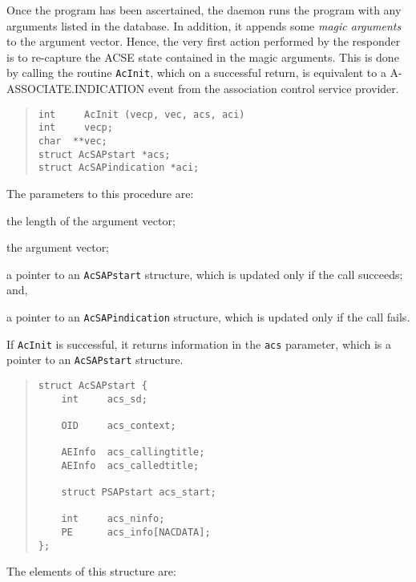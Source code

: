 Once the program has been ascertained,
the daemon runs the program with any arguments listed in the database.
In addition,
it appends some {\em magic arguments\/} to the argument vector.
Hence,
the very first action performed by the responder is to re-capture the ACSE
state contained in the magic arguments.
This is done by calling the routine \verb"AcInit",
which on a successful return,
is equivalent to a {\sf A-ASSOCIATE.INDICATION\/} event from the association
control service provider.
\begin{quote}\small\begin{verbatim}
int     AcInit (vecp, vec, acs, aci)
int     vecp;
char  **vec;
struct AcSAPstart *acs;
struct AcSAPindication *aci;
\end{verbatim}\end{quote}
The parameters to this procedure are:
\begin{describe}
\item[\verb"vecp":] the length of the argument vector;

\item[\verb"vec":] the argument vector;

\item[\verb"acs":] a pointer to an \verb"AcSAPstart" structure,
which is updated only if the call succeeds;
and,

\item[\verb"aci":] a pointer to an \verb"AcSAPindication" structure,
which is updated only if the call fails.
\end{describe}
If \verb"AcInit" is successful,
it returns information in the \verb"acs" parameter,
which is a pointer to an \verb"AcSAPstart" structure.
\begin{quote}\small\begin{verbatim}
struct AcSAPstart {
    int     acs_sd;

    OID     acs_context;

    AEInfo  acs_callingtitle;
    AEInfo  acs_calledtitle;

    struct PSAPstart acs_start;

    int     acs_ninfo;
    PE      acs_info[NACDATA];
};
\end{verbatim}\end{quote}
The elements of this structure are:\label{AcSAPstart}
